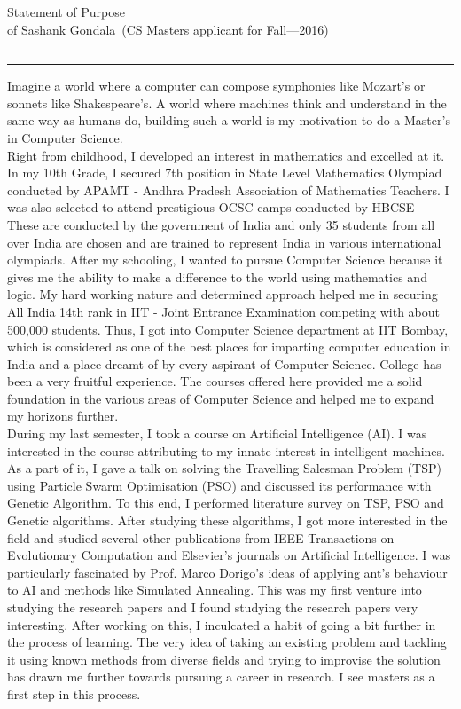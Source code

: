 \documentclass{article}
\newcommand{\soptitle}{Statement of Purpose}
\newcommand{\yourname}{Sashank Gondala}
\begin{document}
\begin{center}\LARGE\soptitle\\
\large of \yourname\ (CS Masters applicant for Fall---2016)
\end{center}

\hrule
\vspace{1pt}
\hrule height 1pt

\bigskip

Imagine a world where a computer can compose symphonies like Mozart’s or sonnets like Shakespeare’s. A world where machines think and understand in the same way as humans do, building such a world is my motivation to do a Master’s in Computer Science.
\\

Right from childhood, I developed an interest in mathematics and excelled at it. In my 10th Grade, I secured 7th position in State Level Mathematics Olympiad conducted by APAMT - Andhra Pradesh Association of Mathematics Teachers. I was also selected to attend prestigious OCSC camps conducted by HBCSE - These are conducted by the government of India and only 35 students from all over India are chosen and are trained to represent India in various international olympiads. After my schooling, I wanted to pursue Computer Science because it gives me the ability to make a difference to the world using mathematics and logic. My hard working nature and determined approach helped me in securing All India 14th rank in IIT - Joint Entrance Examination competing with about 500,000 students. Thus, I got into Computer Science department at IIT Bombay, which is considered as one of the best places for imparting computer education in India and a place dreamt of by every aspirant of Computer Science. College has been a very fruitful experience. The courses offered here provided me a solid foundation in the various areas of Computer Science and helped me to expand my horizons further. 
\\ 

During my last semester, I took a course on Artificial Intelligence (AI). I was interested in the course attributing to my innate interest in intelligent machines. As a part of it, I gave a talk on solving the Travelling Salesman Problem (TSP) using Particle Swarm Optimisation (PSO) and discussed its performance with Genetic Algorithm. To this end, I performed literature survey on TSP, PSO and Genetic algorithms. After studying these algorithms, I got more interested in the field and studied several other publications from IEEE Transactions on Evolutionary Computation and Elsevier’s journals on Artificial Intelligence. I was particularly fascinated by Prof. Marco Dorigo’s ideas of applying ant’s behaviour to AI and methods like Simulated Annealing. This was my first venture into studying the research papers and I found studying the research papers very interesting. After working on this, I inculcated a habit of going a bit further in the process of learning. The very idea of taking an existing problem and tackling it using known methods from diverse fields and trying to improvise the solution has drawn me further towards pursuing a career in research. I see masters as a first step in this process.
\\
\end{document}

